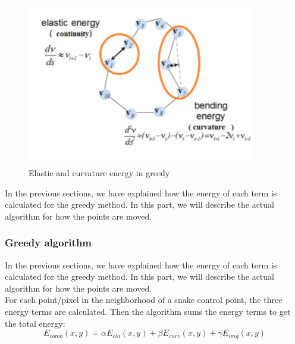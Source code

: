 \begin{figure}[ht]
        \centering
        \includegraphics[width=10cm]{chapiter2/figures/Figure-02.png}
        \caption{Elastic and curvature energy in greedy}
        \label{fig:figure2}
\end{figure}
\vspace{4cm}

\hspace{-0.6cm}In the previous sections, we have explained how the energy of each term is
calculated for the greedy method. In this part, we will describe the actual
algorithm for how the points are moved.

\subsubsection{Greedy algorithm}
In the previous sections, we have explained how the energy of each term is
calculated for the greedy method. In this part, we will describe the actual
algorithm for how the points are moved.\\
For each point/pixel in the neighborhood of a snake control point, the three
energy terms are calculated. Then the algorithm sums the energy terms to get
the total energy:
\begin{equation}
        E_{comb}(x,y) = \alpha E_{ela}(x,y) + \beta E_{curv}(x,y) + \gamma E_{img}(x,y)
        \label{eq:eq20}
\end{equation}

